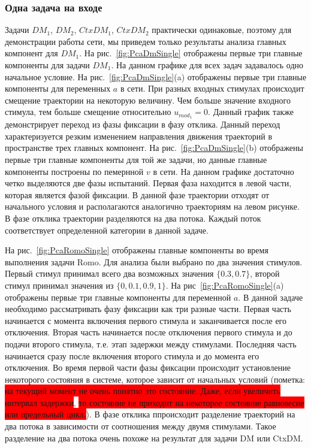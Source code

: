 \documentclass{article}
\begin{document}
\subsubsection{Одна задача на входе}

Задачи $DM_1$, $DM_2$, $CtxDM_1$, $CtxDM_2$ практически одинаковые, поэтому для демонстрации работы сети, мы приведем только результаты анализа главных компонент для $DM_1$. На рис.~\ref{fig:PcaDmSingle} отображены первые три главные компоненты для задачи $DM_1$. На данном графике для всех задач задавалось одно начальное условие. На рис.~\ref{fig:PcaDmSingle}(a) отображены первые три главные компоненты для переменных $a$ в сети. При разных входных стимулах происходит смещение траектории на некоторую величину. Чем больше значение входного стимула, тем больше смещение относительно $u_{mod_1} = 0$. Данный график также демонстрирует переход из фазы фиксации в фазу отклика. Данный переход характеризуется резким изменением направления движения траекторий в пространстве трех главных компонент. На рис.~\ref{fig:PcaDmSingle}(b) отображены первые три главные компоненты для той же задачи, но данные главные компоненты построены по пемернной $v$ в сети. На данном графике достаточно четко выделяются две фазы испытаний. Первая фаза находится в левой части, которая является фазой фиксации. В данной фазе траектории отходят от начального условия и располагаются аналогично траекториям на левом рисунке. В фазе отклика траектории разделяются на два потока. Каждый поток соответствует определенной категории в данной задаче.

На рис.~\ref{fig:PcaRomoSingle} отображены главные компоненты во время выполнения задачи Romo. Для анализа были выбрано по два значения стимулов. Первый стимул принимал всего два возможных значения $\{0.3, 0.7\}$, второй стимул принимал значения из $\{0, 0.1, 0.9, 1\}$. На рис~\ref{fig:PcaRomoSingle}(a) отображены первые три главные компоненты для переменной $a$. В данной задаче необходимо рассматривать фазу фиксации как три разные части. Первая часть начинается с момента включения первого стимула и заканчивается после его отключения. Вторая часть начинается после отключения первого стимула и до подачи второго стимула, т.е. этап задержки между стимулами. Последняя часть начинается сразу после включения второго стимула и до момента его отключения. Во время первой части фазы фиксации происходит установление некоторого состояния в системе, которое зависит от начальных условий (пометка: \colorbox{red}{на текущий момент не очень понятно это состояние. Даже, если увеличить интервал задержки}, \colorbox{red}{то состояние не приходит на некоторое состояние равновесие или предельный цикл.}). В фазе отклика ппроисходит разделение траекторий на два потока в зависимости от соотношения между двумя стимулами. Такое разделение на два потока очень похоже на результат для задачи DM или CtxDM.
\end{document}
